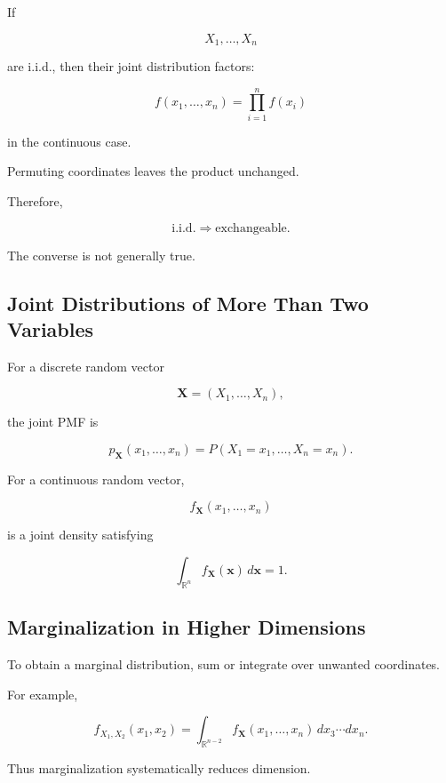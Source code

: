 If

\[
X_1,\ldots,X_n
\]

are i.i.d., then their joint distribution factors:

\[
\boxed{
f(x_1,\ldots,x_n)
=
\prod_{i=1}^{n}f(x_i)
}
\]

in the continuous case.

Permuting coordinates leaves the product unchanged.

Therefore,

\[
\boxed{
\text{i.i.d.}
\Longrightarrow
\text{exchangeable}.
}
\]

The converse is not generally true.

\subsection{Joint Distributions of More Than Two Variables}
\label{subsec:multivariate-joint-distributions}

For a discrete random vector

\[
\mathbf{X}
=
(X_1,\ldots,X_n),
\]

the joint PMF is

\[
\boxed{
p_{\mathbf{X}}
(x_1,\ldots,x_n)
=
P(X_1=x_1,\ldots,X_n=x_n).
}
\]

For a continuous random vector,

\[
\boxed{
f_{\mathbf{X}}
(x_1,\ldots,x_n)
}
\]

is a joint density satisfying

\[
\boxed{
\int_{\mathbb{R}^n}
f_{\mathbf{X}}(\mathbf{x})\,d\mathbf{x}
=
1.
}
\]

\subsection{Marginalization in Higher Dimensions}
\label{subsec:higher-dimensional-marginalization}

To obtain a marginal distribution, sum or integrate over unwanted
coordinates.

For example,

\[
f_{X_1,X_2}(x_1,x_2)
=
\int_{\mathbb{R}^{n-2}}
f_{\mathbf{X}}
(x_1,\ldots,x_n)
\,dx_3\cdots dx_n.
\]

Thus marginalization systematically reduces dimension.

